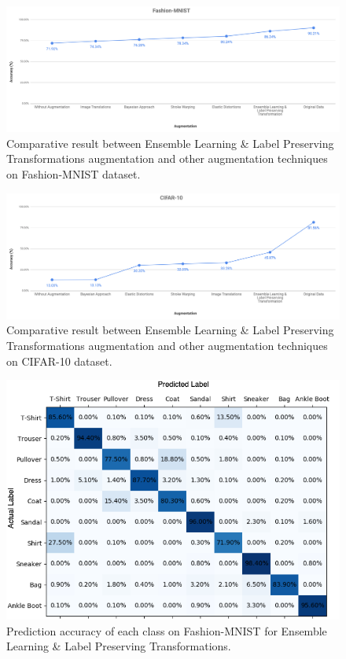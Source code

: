 \begin{figure}
  \centering
  \label{fig:Fashion_MNIST_ensamble_result}
  \includegraphics[width=1\textwidth]{fig/contribution/fashion-mnist-ensamble-result}
  \caption{Comparative result between Ensemble Learning \& Label Preserving Transformations augmentation and other augmentation techniques on Fashion-MNIST dataset.}
\end{figure}


\begin{figure}
  \centering
  \label{fig:Cifar_10_ensamble_result}
  \includegraphics[width=1\textwidth]{fig/contribution/cifar-10-ensamble-result}
  \caption{Comparative result between Ensemble Learning \& Label Preserving Transformations augmentation and other augmentation techniques on CIFAR-10 dataset.}
\end{figure}

\begin{figure}
  \centering
  \label{fig:Fashion_MNIST_Ensamble_Heatmaps}
  \includegraphics[width=1\textwidth]{fig/contribution/Fashion_MNIST_Ensamble}
  \caption{Prediction accuracy of each class on Fashion-MNIST for Ensemble Learning \& Label Preserving Transformations.}
\end{figure}

